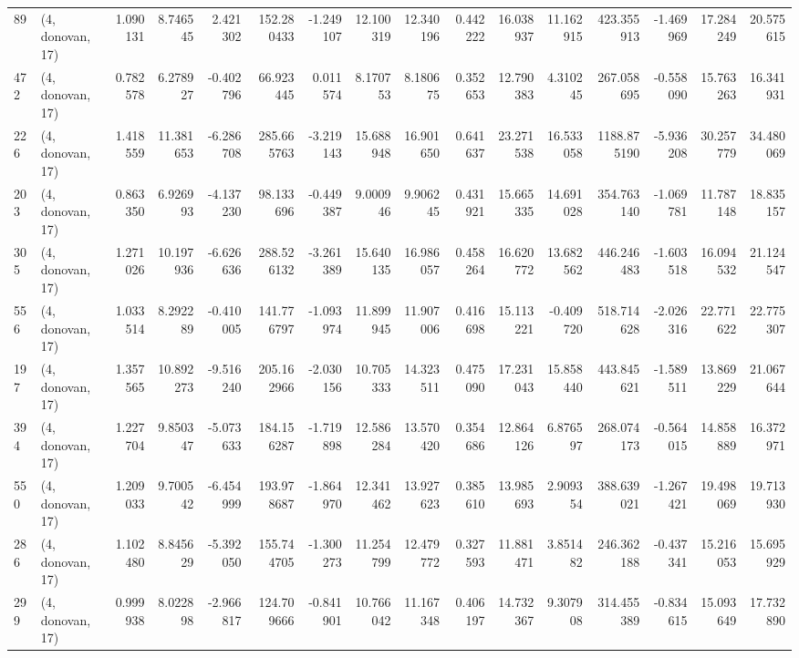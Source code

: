 \begin{tabular}{llrrrrrrrrrrrrrr}
89  &  (4, donovan, 17) &   1.090131 &   8.746545 &   2.421302 &   152.280433 &  -1.249107 &  12.100319 &  12.340196 &  0.442222 &  16.038937 &  11.162915 &    423.355913 &  -1.469969 &  17.284249 &   20.575615 \\
472 &  (4, donovan, 17) &   0.782578 &   6.278927 &  -0.402796 &    66.923445 &   0.011574 &   8.170753 &   8.180675 &  0.352653 &  12.790383 &   4.310245 &    267.058695 &  -0.558090 &  15.763263 &   16.341931 \\
226 &  (4, donovan, 17) &   1.418559 &  11.381653 &  -6.286708 &   285.665763 &  -3.219143 &  15.688948 &  16.901650 &  0.641637 &  23.271538 &  16.533058 &   1188.875190 &  -5.936208 &  30.257779 &   34.480069 \\
203 &  (4, donovan, 17) &   0.863350 &   6.926993 &  -4.137230 &    98.133696 &  -0.449387 &   9.000946 &   9.906245 &  0.431921 &  15.665335 &  14.691028 &    354.763140 &  -1.069781 &  11.787148 &   18.835157 \\
305 &  (4, donovan, 17) &   1.271026 &  10.197936 &  -6.626636 &   288.526132 &  -3.261389 &  15.640135 &  16.986057 &  0.458264 &  16.620772 &  13.682562 &    446.246483 &  -1.603518 &  16.094532 &   21.124547 \\
556 &  (4, donovan, 17) &   1.033514 &   8.292289 &  -0.410005 &   141.776797 &  -1.093974 &  11.899945 &  11.907006 &  0.416698 &  15.113221 &  -0.409720 &    518.714628 &  -2.026316 &  22.771622 &   22.775307 \\
197 &  (4, donovan, 17) &   1.357565 &  10.892273 &  -9.516240 &   205.162966 &  -2.030156 &  10.705333 &  14.323511 &  0.475090 &  17.231043 &  15.858440 &    443.845621 &  -1.589511 &  13.869229 &   21.067644 \\
394 &  (4, donovan, 17) &   1.227704 &   9.850347 &  -5.073633 &   184.156287 &  -1.719898 &  12.586284 &  13.570420 &  0.354686 &  12.864126 &   6.876597 &    268.074173 &  -0.564015 &  14.858889 &   16.372971 \\
550 &  (4, donovan, 17) &   1.209033 &   9.700542 &  -6.454999 &   193.978687 &  -1.864970 &  12.341462 &  13.927623 &  0.385610 &  13.985693 &   2.909354 &    388.639021 &  -1.267421 &  19.498069 &   19.713930 \\
286 &  (4, donovan, 17) &   1.102480 &   8.845629 &  -5.392050 &   155.744705 &  -1.300273 &  11.254799 &  12.479772 &  0.327593 &  11.881471 &   3.851482 &    246.362188 &  -0.437341 &  15.216053 &   15.695929 \\
299 &  (4, donovan, 17) &   0.999938 &   8.022898 &  -2.966817 &   124.709666 &  -0.841901 &  10.766042 &  11.167348 &  0.406197 &  14.732367 &   9.307908 &    314.455389 &  -0.834615 &  15.093649 &   17.732890 \\

\end{tabular}
